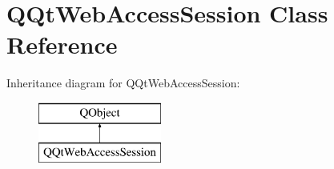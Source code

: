 \hypertarget{class_q_qt_web_access_session}{}\section{Q\+Qt\+Web\+Access\+Session Class Reference}
\label{class_q_qt_web_access_session}
Inheritance diagram for Q\+Qt\+Web\+Access\+Session\+:\begin{figure}[H]
\begin{center}
\leavevmode
\includegraphics[height=2.000000cm]{class_q_qt_web_access_session}
\end{center}
\end{figure}
